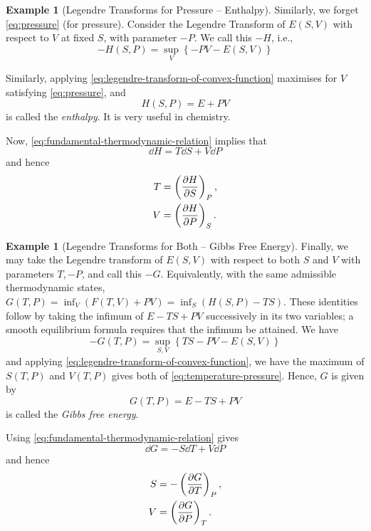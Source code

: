 \documentclass[11pt]{article}
\numberwithin{equation}{section}
\theoremstyle{definition}
\newtheorem{example}[theorem]{Example}
\theoremstyle{remark}
\newcommand{\pqty}[1]{\left(#1\right)}
\newcommand{\Bqty}[1]{\left\{#1\right\}}
\begin{document}
\begin{example}[Legendre Transforms for Pressure -- Enthalpy]\label{variation-unit-0030}
    Similarly, we forget \autoref{eq:pressure} (for pressure). Consider the Legendre Transform of \(E\pqty{S, V}\) with respect to \(V\) at fixed \(S\), with parameter \(-P\). We call this \(-H\), i.e.,
    \[
        -H \pqty{S, P} = \sup_{V} \Bqty{-PV - E\pqty{S,V}}
    \]

    Similarly, applying \autoref{eq:legendre-transform-of-convex-function} maximises for \(V\) satisfying \autoref{eq:pressure}, and
    \[
        H\pqty{S, P} = E + PV
    \]
    is called the \emph{enthalpy}. It is very useful in chemistry.

    Now, \autoref{eq:fundamental-thermodynamic-relation} implies that
    \[
        \dd{H} = T \dd{S} + V \dd{P}
    \]
    and hence
    \begin{align*}
        T &= \pqty{\pdv{H}{S}}_{P}, \\
        V &= \pqty{\pdv{H}{P}}_{S}.
    \end{align*}
\end{example}

\begin{example}[Legendre Transforms for Both -- Gibbs Free Energy]\label{variation-unit-0031}
    Finally, we may take the Legendre transform of \(E \pqty{S, V}\) with respect to both \(S\) and \(V\) with parameters \(T, -P\), and call this \(-G\). Equivalently, with the same admissible thermodynamic states,
\(G(T,P)=\inf_V(F(T,V)+PV)=\inf_S(H(S,P)-TS)\).
These identities follow by taking the infimum of \(E-TS+PV\) successively in its two variables; a smooth equilibrium formula requires that the infimum be attained. We have
    \[
        -G \pqty{T, P} = \sup_{S, V} \Bqty{TS - PV - E \pqty{S, V}}
    \]
    and applying \autoref{eq:legendre-transform-of-convex-function}, we have the maximum of \(S\pqty{T, P}\) and \(V\pqty{T, P}\) gives both of \autoref{eq:temperature-pressure}. Hence, \(G\) is given by
    \[
        G\pqty{T, P} = E - TS + PV
    \]
    is called the \emph{Gibbs free energy}.

    Using \autoref{eq:fundamental-thermodynamic-relation} gives
    \[
        \dd{G} = -S \dd{T} + V \dd{P}
    \]
    and hence
    \begin{align*}
        S &= - \pqty{\pdv{G}{T}}_{P}, \\
        V &= \pqty{\pdv{G}{P}}_{T}.
    \end{align*}
\end{example}
\end{document}
